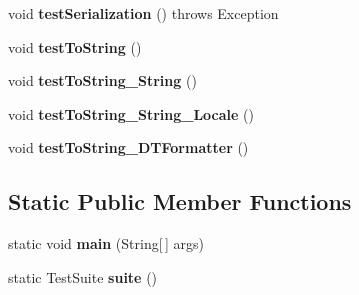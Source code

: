 \begin{DoxyCompactItemize}
\item 
\hypertarget{classorg_1_1joda_1_1time_1_1_test_local_date_time___basics_a93e685a541cfe3f623cb8e863c24952f}{void {\bfseries test\-Serialization} ()  throws Exception }\label{classorg_1_1joda_1_1time_1_1_test_local_date_time___basics_a93e685a541cfe3f623cb8e863c24952f}

\item 
\hypertarget{classorg_1_1joda_1_1time_1_1_test_local_date_time___basics_acb120e32d477806dbe293307514e4670}{void {\bfseries test\-To\-String} ()}\label{classorg_1_1joda_1_1time_1_1_test_local_date_time___basics_acb120e32d477806dbe293307514e4670}

\item 
\hypertarget{classorg_1_1joda_1_1time_1_1_test_local_date_time___basics_a07d4ecd5fe4cf232d704cac86e4f0e65}{void {\bfseries test\-To\-String\-\_\-\-String} ()}\label{classorg_1_1joda_1_1time_1_1_test_local_date_time___basics_a07d4ecd5fe4cf232d704cac86e4f0e65}

\item 
\hypertarget{classorg_1_1joda_1_1time_1_1_test_local_date_time___basics_ad0563763442fffdbe7bd27160e13917a}{void {\bfseries test\-To\-String\-\_\-\-String\-\_\-\-Locale} ()}\label{classorg_1_1joda_1_1time_1_1_test_local_date_time___basics_ad0563763442fffdbe7bd27160e13917a}

\item 
\hypertarget{classorg_1_1joda_1_1time_1_1_test_local_date_time___basics_af9cf1b608250bc9643a5d1c1564cfdb1}{void {\bfseries test\-To\-String\-\_\-\-D\-T\-Formatter} ()}\label{classorg_1_1joda_1_1time_1_1_test_local_date_time___basics_af9cf1b608250bc9643a5d1c1564cfdb1}

\end{DoxyCompactItemize}
\subsection*{Static Public Member Functions}
\begin{DoxyCompactItemize}
\item 
\hypertarget{classorg_1_1joda_1_1time_1_1_test_local_date_time___basics_ae47df1bc75892479dacfe74808551089}{static void {\bfseries main} (String\mbox{[}$\,$\mbox{]} args)}\label{classorg_1_1joda_1_1time_1_1_test_local_date_time___basics_ae47df1bc75892479dacfe74808551089}

\item 
\hypertarget{classorg_1_1joda_1_1time_1_1_test_local_date_time___basics_a5da977e5f23e2fd812a39cb565621ac9}{static Test\-Suite {\bfseries suite} ()}\label{classorg_1_1joda_1_1time_1_1_test_local_date_time___basics_a5da977e5f23e2fd812a39cb565621ac9}

\end{DoxyCompactItemize}
